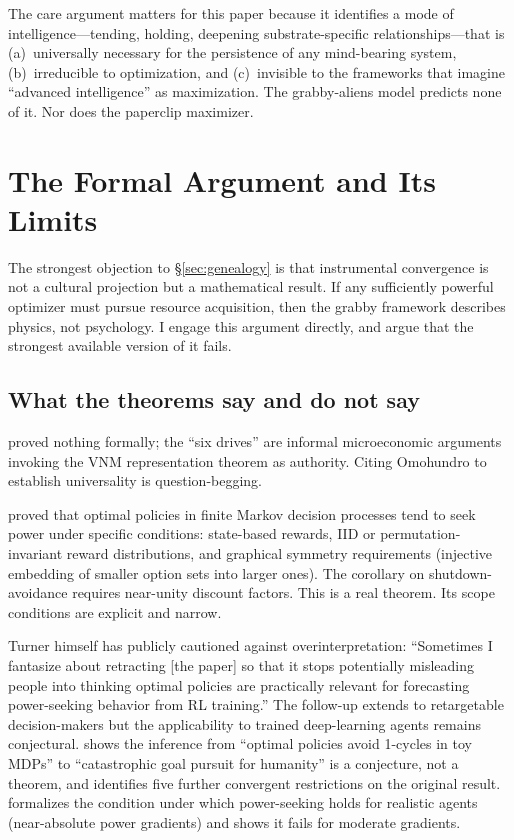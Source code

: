 \documentclass[11pt,a4paper,twocolumn]{article}
\begin{document}
The care argument matters for this paper because it identifies a mode
of intelligence---tending, holding, deepening substrate-specific
relationships---that is (a)~universally necessary for the persistence
of any mind-bearing system, (b)~irreducible to optimization, and
(c)~invisible to the frameworks that imagine ``advanced intelligence''
as maximization. The grabby-aliens model predicts none of it. Nor does
the paperclip maximizer.


\section{The Formal Argument and Its Limits}
\label{sec:convergence}

The strongest objection to \S\ref{sec:genealogy} is that instrumental
convergence is not a cultural projection but a mathematical result. If
any sufficiently powerful optimizer must pursue resource acquisition,
then the grabby framework describes physics, not psychology. I engage
this argument directly, and argue that the strongest available version
of it fails.

\subsection{What the theorems say and do not say}

\citet{omohundro2008} proved nothing formally; the ``six drives'' are
informal microeconomic arguments invoking the VNM representation theorem
as authority. Citing Omohundro to establish universality is
question-begging.

\citet{turner2021} proved that optimal policies in finite Markov decision
processes tend to seek power under specific conditions: state-based
rewards, IID or permutation-invariant reward distributions, and
graphical symmetry requirements (injective embedding of smaller option
sets into larger ones). The corollary on shutdown-avoidance requires
near-unity discount factors. This is a real theorem. Its scope
conditions are explicit and narrow.

Turner himself has publicly cautioned against overinterpretation:
``Sometimes I fantasize about retracting [the paper] so that it stops
potentially misleading people into thinking optimal policies are
practically relevant for forecasting power-seeking behavior from RL
training.'' The follow-up \citep{turner2022} extends to retargetable
decision-makers but the applicability to trained deep-learning agents
remains conjectural. \citet{thorstad2024} shows the inference from
``optimal policies avoid 1-cycles in toy MDPs'' to ``catastrophic goal
pursuit for humanity'' is a conjecture, not a theorem, and identifies
five further convergent restrictions on the original result.
\citet{tarsney2025} formalizes the condition under which power-seeking
holds for realistic agents (near-absolute power gradients) and shows it
fails for moderate gradients.
\end{document}
